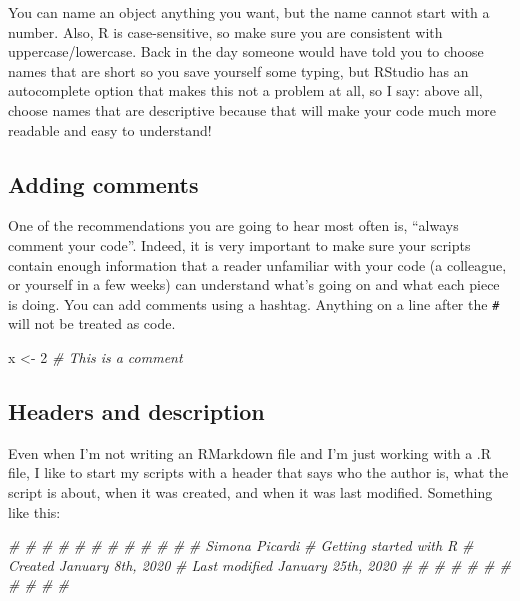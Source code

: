 \documentclass[
]{book}
\newenvironment{Shaded}{\begin{snugshade}}{\end{snugshade}}
\newcommand{\CommentTok}[1]{\textcolor[rgb]{0.56,0.35,0.01}{\textit{#1}}}
\newcommand{\DecValTok}[1]{\textcolor[rgb]{0.00,0.00,0.81}{#1}}
\newcommand{\NormalTok}[1]{#1}
\newcommand{\OtherTok}[1]{\textcolor[rgb]{0.56,0.35,0.01}{#1}}
\begin{document}
You can name an object anything you want, but the name
cannot start with a number. Also, R is case-sensitive, so make sure you are
consistent with uppercase/lowercase. Back in the day someone would have told you
to choose names that are short so you save yourself some typing, but RStudio
has an autocomplete option that makes this not a problem at all, so I say: above
all, choose names that are descriptive because that will make your code much
more readable and easy to understand!

\hypertarget{adding-comments}{%
\subsection{Adding comments}\label{adding-comments}}

One of the recommendations you are going to hear most often is, ``always comment
your code''. Indeed, it is very important to make sure your scripts contain
enough information that a reader unfamiliar with your code (a colleague, or
yourself in a few weeks) can understand what's going on and what each piece is
doing. You can add comments using a hashtag. Anything on a line after the \texttt{\#}
will not be treated as code.

\begin{Shaded}
\begin{Highlighting}[]
\NormalTok{x }\OtherTok{\textless{}{-}} \DecValTok{2} \CommentTok{\# This is a comment}
\end{Highlighting}
\end{Shaded}

\hypertarget{headers-and-description}{%
\subsection{Headers and description}\label{headers-and-description}}

Even when I'm not writing an RMarkdown file and I'm just working with a .R file,
I like to start my scripts with a header that says who the author is, what the
script is about, when it was created, and when it was last modified. Something
like this:

\begin{Shaded}
\begin{Highlighting}[]
\CommentTok{\# \# \# \# \# \# \# \# \# \# \#}
\CommentTok{\# Simona Picardi}
\CommentTok{\# Getting started with R}
\CommentTok{\# Created January 8th, 2020}
\CommentTok{\# Last modified January 25th, 2020}
\CommentTok{\# \# \# \# \# \# \# \# \# \# \# }
\end{Highlighting}
\end{Shaded}
\end{document}
